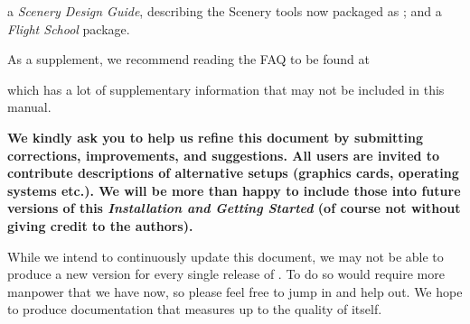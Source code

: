  \noindent
a \textit{\FlightGear{} Scenery Design Guide},
describing the Scenery tools now packaged as \TerraGear{}; and a \textit{\FlightGear{}
Flight School} package.
 \medskip

As a supplement, we recommend reading the \FlightGear{} FAQ to be found at


which has a lot of supplementary information that may not be included in this manual.

\textbf{We kindly ask you to help us refine this document by submitting corrections,
improvements, and suggestions. All users are invited to contribute descriptions of alternative
setups (graphics cards, operating systems etc.). We will be more than happy to include
those into future versions of this \textit{Installation and Getting Started} (of course
not without giving credit to the authors).}

While we intend to continuously update this document, we may not be able to produce a
new version for every single release of {\FlightGear{}}.  To do so would require more
manpower that we have now, so please feel free to jump in and help out.  We hope to
produce documentation that measures up to the quality of \FlightGear{} itself.


